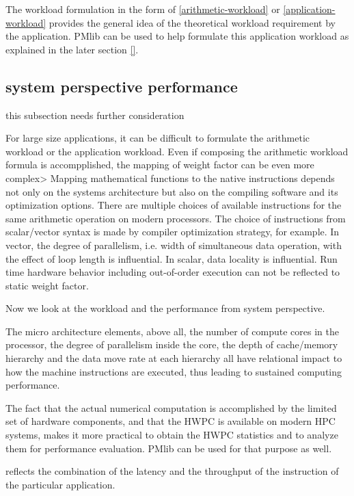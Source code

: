 \documentclass[conference]{IEEEtran}
\begin{document}
The workload formulation in the form of
\eqref{arithmetic-workload}
or
\eqref{application-workload}
provides the general idea of the theoretical workload requirement by the
application.
PMlib can be used to help formulate this application workload as explained
in the later section \ref{}.


\subsection{system perspective performance}
\label{subsection:system-perspective-performance}

{\color{blue} this subsection needs further consideration}

For large size applications, it can be difficult to formulate
the arithmetic workload or the application workload.
Even if composing the arithmetic workload formula is accompplished,
the mapping of weight factor can be even more complex>
Mapping mathematical functions to the native instructions
depends not only on the systems architecture but also on the compiling
software and its optimization options.
There are multiple choices of available instructions for the same
arithmetic operation on modern processors.
The choice of instructions from scalar/vector syntax is made by
compiler optimization strategy, for example.
In vector, the degree of parallelism, i.e. width of simultaneous data
operation, with the effect of loop length is influential.
In scalar, data locality is influential.
Run time hardware behavior including out-of-order execution can not
be reflected to static weight factor.

Now we look at the workload and the performance from system perspective.

The micro architecture elements, above all, the number of compute cores
in the processor, the degree of parallelism inside the core,
the depth of cache/memory hierarchy and the data move rate at each hierarchy
all have relational impact to how the machine instructions are executed,
thus leading to sustained computing performance.


The fact that the actual numerical computation is accomplished by the
limited set of hardware components, and that the HWPC is available
on modern HPC systems, makes it more practical to obtain the HWPC statistics
and to analyze them for performance evaluation.
PMlib can be used for that purpose as well.


reflects the combination of the latency and the throughput of the instruction
of the particular application.
\end{document}
